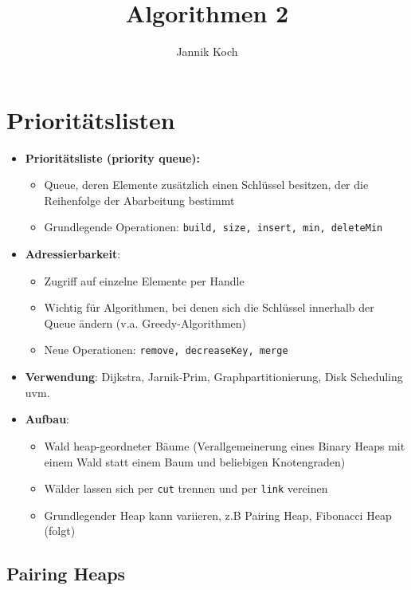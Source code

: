 \documentclass[10pt,a4paper]{article}
\author{Jannik Koch}
\title{Algorithmen 2}
\begin{document}
	{\let\newpage\relax\maketitle}
	\tableofcontents
	\newpage
	\setcounter{page}{1}

	\section{Prioritätslisten}
	\label{pl:sec:prioritaetslisten}
	
	\begin{itemize}
		\item \textbf{Prioritätsliste (priority queue):}
		\begin{itemize}
			\item Queue, deren Elemente zusätzlich einen Schlüssel besitzen, der die Reihenfolge der Abarbeitung bestimmt
			\item Grundlegende Operationen: \texttt{build, size, insert, min, deleteMin}
		\end{itemize}
		\item \textbf{Adressierbarkeit}:
		\begin{itemize}
			\item Zugriff auf einzelne Elemente per Handle
			\item Wichtig für Algorithmen, bei denen sich die Schlüssel innerhalb der Queue ändern (v.a. Greedy-Algorithmen)
			\item Neue Operationen: \texttt{remove, decreaseKey, merge}
		\end{itemize}
		\item \textbf{Verwendung}: Dijkstra, Jarnik-Prim, Graphpartitionierung, Disk Scheduling uvm.
		\item \textbf{Aufbau}:
		\begin{itemize}
			\item Wald heap-geordneter Bäume (Verallgemeinerung eines Binary Heaps mit einem Wald statt einem Baum und beliebigen Knotengraden)
			\item Wälder lassen sich per \texttt{cut} trennen und per \texttt{link} vereinen
			\item Grundlegender Heap kann variieren, z.B Pairing Heap, Fibonacci Heap (folgt)
		\end{itemize}
 	\end{itemize}

 	\subsection{Pairing Heaps}
 	\label{pl:sub:pairing_heaps}
\end{document}
